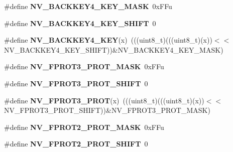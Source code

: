 \begin{DoxyCompactItemize}
\item 
\#define {\bfseries N\+V\+\_\+\+B\+A\+C\+K\+K\+E\+Y4\+\_\+\+K\+E\+Y\+\_\+\+M\+A\+SK}~0x\+F\+Fu\hypertarget{group__NV__Register__Masks_ga49a74f76cf8b7787284ac6e510e4e0c3}{}\label{group__NV__Register__Masks_ga49a74f76cf8b7787284ac6e510e4e0c3}

\item 
\#define {\bfseries N\+V\+\_\+\+B\+A\+C\+K\+K\+E\+Y4\+\_\+\+K\+E\+Y\+\_\+\+S\+H\+I\+FT}~0\hypertarget{group__NV__Register__Masks_gadfa9b097c522673010b11e94a5a7b9eb}{}\label{group__NV__Register__Masks_gadfa9b097c522673010b11e94a5a7b9eb}

\item 
\#define {\bfseries N\+V\+\_\+\+B\+A\+C\+K\+K\+E\+Y4\+\_\+\+K\+EY}(x)~(((uint8\+\_\+t)(((uint8\+\_\+t)(x))$<$$<$N\+V\+\_\+\+B\+A\+C\+K\+K\+E\+Y4\+\_\+\+K\+E\+Y\+\_\+\+S\+H\+I\+FT))\&N\+V\+\_\+\+B\+A\+C\+K\+K\+E\+Y4\+\_\+\+K\+E\+Y\+\_\+\+M\+A\+SK)\hypertarget{group__NV__Register__Masks_gaec4a23e778980f71beab56e3353a0abb}{}\label{group__NV__Register__Masks_gaec4a23e778980f71beab56e3353a0abb}

\item 
\#define {\bfseries N\+V\+\_\+\+F\+P\+R\+O\+T3\+\_\+\+P\+R\+O\+T\+\_\+\+M\+A\+SK}~0x\+F\+Fu\hypertarget{group__NV__Register__Masks_ga1a2ecc3ba1f6ae4c2db7fcaa8f369b34}{}\label{group__NV__Register__Masks_ga1a2ecc3ba1f6ae4c2db7fcaa8f369b34}

\item 
\#define {\bfseries N\+V\+\_\+\+F\+P\+R\+O\+T3\+\_\+\+P\+R\+O\+T\+\_\+\+S\+H\+I\+FT}~0\hypertarget{group__NV__Register__Masks_gaee74e224c0572f7618f28c11d921b6e3}{}\label{group__NV__Register__Masks_gaee74e224c0572f7618f28c11d921b6e3}

\item 
\#define {\bfseries N\+V\+\_\+\+F\+P\+R\+O\+T3\+\_\+\+P\+R\+OT}(x)~(((uint8\+\_\+t)(((uint8\+\_\+t)(x))$<$$<$N\+V\+\_\+\+F\+P\+R\+O\+T3\+\_\+\+P\+R\+O\+T\+\_\+\+S\+H\+I\+FT))\&N\+V\+\_\+\+F\+P\+R\+O\+T3\+\_\+\+P\+R\+O\+T\+\_\+\+M\+A\+SK)\hypertarget{group__NV__Register__Masks_ga67cd7aad5307a5ee8de3a2dd16c6315c}{}\label{group__NV__Register__Masks_ga67cd7aad5307a5ee8de3a2dd16c6315c}

\item 
\#define {\bfseries N\+V\+\_\+\+F\+P\+R\+O\+T2\+\_\+\+P\+R\+O\+T\+\_\+\+M\+A\+SK}~0x\+F\+Fu\hypertarget{group__NV__Register__Masks_ga99b7ccf89e4d3cc80d0317086202de0f}{}\label{group__NV__Register__Masks_ga99b7ccf89e4d3cc80d0317086202de0f}

\item 
\#define {\bfseries N\+V\+\_\+\+F\+P\+R\+O\+T2\+\_\+\+P\+R\+O\+T\+\_\+\+S\+H\+I\+FT}~0\hypertarget{group__NV__Register__Masks_ga50f9336b86839704ca20297b040c3ca5}{}\label{group__NV__Register__Masks_ga50f9336b86839704ca20297b040c3ca5}


\end{DoxyCompactItemize}
